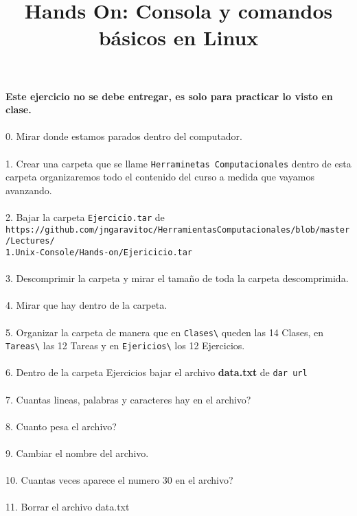 \documentclass[12pt]{article}
\title{\begin{LARGE}
{Hands On: Consola y comandos b\'asicos en Linux}
\end{LARGE}}
\begin{document}
\maketitle
\textbf{Este ejercicio no se debe entregar, es solo para practicar lo visto en clase.}\\
\\
0. Mirar donde estamos parados dentro del computador. \\
\\
1. Crear una carpeta que se llame \verb"Herraminetas Computacionales" dentro de esta carpeta
organizaremos todo el contenido del curso a medida que vayamos avanzando.\\
\\
2. Bajar la carpeta \verb"Ejercicio.tar" de \\ \verb"https://github.com/jngaravitoc/HerramientasComputacionales/blob/master/Lectures/"\\
\verb"1.Unix-Console/Hands-on/Ejericicio.tar"\\
\\
3. Descomprimir la carpeta y mirar el tamaño de toda la carpeta descomprimida.\\
\\
4. Mirar que hay dentro de la carpeta.\\
\\
5. Organizar la carpeta de manera que en \verb"Clases\" queden las 14 Clases, en \verb"Tareas\"
las 12 Tareas y en \verb"Ejericios\" los 12 Ejercicios. \\
\\
6. Dentro de la carpeta Ejercicios bajar el archivo \textbf{data.txt} de \verb"dar url"\\
\\
7. Cuantas lineas, palabras y caracteres hay en el archivo?\\
\\
8. Cuanto pesa el archivo?	\\
\\
9. Cambiar el nombre del archivo.\\
\\
10. Cuantas veces aparece el numero 30 en el archivo?\\
\\
11. Borrar el archivo data.txt\\
\end{document}
